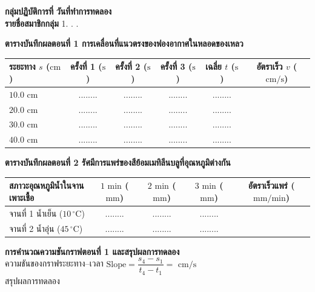 \begin{worksheetbox}
\noindent\textbf{กลุ่มปฏิบัติการที่} \dotfill \textbf{วันที่ทำการทดลอง} \dotfill\\[4pt]
\noindent\textbf{รายชื่อสมาชิกกลุ่ม} 1. . . \dotfill

\vspace{6pt}
\noindent\textbf{ตารางบันทึกผลตอนที่ 1 การเคลื่อนที่แนวตรงของฟองอากาศในหลอดของเหลว}
\begin{center}
\footnotesize\setlength{\tabcolsep}{3.5pt}
\begin{tabularx}{\linewidth}{>{\raggedright\arraybackslash}X c c c c c}
\toprule
\textbf{ระยะทาง $s$ ($\text{cm}$)} & \textbf{ครั้งที่ 1 ($\text{s}$)} & \textbf{ครั้งที่ 2 ($\text{s}$)} & \textbf{ครั้งที่ 3 ($\text{s}$)} & \textbf{เฉลี่ย $t$ ($\text{s}$)} & \textbf{อัตราเร็ว $v$ ($\text{cm/s}$)} \\
\midrule
$10.0\text{ cm}$ & ........ & ........ & ........ & ........ & \dotfill \\
$20.0\text{ cm}$ & ........ & ........ & ........ & ........ & \dotfill \\
$30.0\text{ cm}$ & ........ & ........ & ........ & ........ & \dotfill \\
$40.0\text{ cm}$ & ........ & ........ & ........ & ........ & \dotfill \\
\bottomrule
\end{tabularx}
\end{center}

\vspace{4pt}
\noindent\textbf{ตารางบันทึกผลตอนที่ 2 รัศมีการแพร่ของสีย้อมเมทิลีนบลูที่อุณหภูมิต่างกัน}
\begin{center}
\footnotesize\setlength{\tabcolsep}{3.5pt}
\begin{tabularx}{\linewidth}{>{\raggedright\arraybackslash}X c c c c}
\toprule
\textbf{สภาวะอุณหภูมิน้ำในจานเพาะเชื้อ} & \textbf{$1\text{ min}$ ($\text{mm}$)} & \textbf{$2\text{ min}$ ($\text{mm}$)} & \textbf{$3\text{ min}$ ($\text{mm}$)} & \textbf{อัตราเร็วแพร่ ($\text{mm/min}$)} \\
\midrule
จานที่ 1 น้ำเย็น ($10\,^\circ\text{C}$) & ........ & ........ & ........ & \dotfill \\
จานที่ 2 น้ำอุ่น ($45\,^\circ\text{C}$) & ........ & ........ & ........ & \dotfill \\
\bottomrule
\end{tabularx}
\end{center}

\vspace{4pt}
\noindent\textbf{การคำนวณความชันกราฟตอนที่ 1 และสรุปผลการทดลอง}\\[4pt]
ความชันของกราฟระยะทาง--เวลา $\text{Slope} = \dfrac{s_4 - s_1}{t_4 - t_1} = $ \dotfill $\text{cm/s}$\\[6pt]
สรุปผลการทดลอง \dotfill\\[6pt]
\dotfill
\end{worksheetbox}

